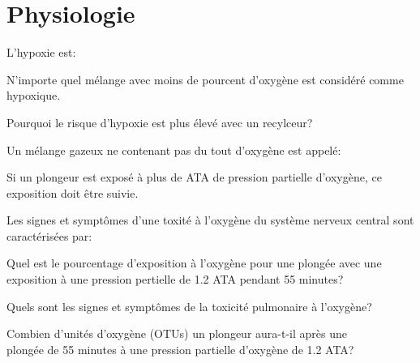 \documentclass[english,12pt,a4paper]{article}
\begin{document}
	\section{Physiologie}
	\begin{outline}
		\1 L'hypoxie est:
			\2 \hspace{-2em}\hrulefill
			\2 \hspace{-2em}\hrulefill
			
		\1 N'importe quel mélange avec moins de \underline{\hspace{1.5cm}} pourcent d'oxygène est considéré comme hypoxique.

		\1 Pourquoi le risque d'hypoxie est plus élevé avec un recylceur?
			\2 \hspace{-2em}\hrulefill
			\2 \hspace{-2em}\hrulefill
			\2 \hspace{-2em}\hrulefill

		\1 Un mélange gazeux ne contenant pas du tout d'oxygène est appelé:
			\2 \hspace{-2em}\hrulefill

		\1 Si un plongeur est exposé à plus de \underline{\hspace{1.5cm}} ATA de pression partielle d'oxygène, ce exposition doit être suivie.

		\1 Les signes et symptômes d'une toxité à l'oxygène du système nerveux central sont caractérisées par:
			\2 \hspace{-2em}\hrulefill
			\2 \hspace{-2em}\hrulefill
			\2 \hspace{-2em}\hrulefill
			\2 \hspace{-2em}\hrulefill
			\2 \hspace{-2em}\hrulefill
			\2 \hspace{-2em}\hrulefill
			\2 \hspace{-2em}\hrulefill

		\1 Quel est le pourcentage d'exposition à l'oxygène pour une plongée avec une exposition à une pression pertielle de 1.2 ATA pendant 55 minutes?
			\2 \hspace{-2em}\hrulefill
			\2 \hspace{-2em}\hrulefill

		\1 Quels sont les signes et symptômes de la toxicité pulmonaire à l'oxygène?
			\2 \hspace{-2em}\hrulefill
			\2 \hspace{-2em}\hrulefill

		\1 Combien d'unités d'oxygène (OTUs) un plongeur aura-t-il après une\\plongée de 55 minutes à une pression partielle d'oxygène de 1.2 ATA?
			\2 \hspace{-2em}\hrulefill
			\2 \hspace{-2em}\hrulefill


\end{outline}
\end{document}
